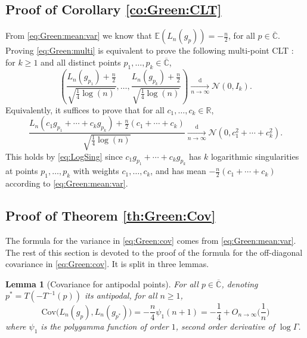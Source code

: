 \documentclass[10pt,reqno]{amsart}
\numberwithin{equation}{section}
\numberwithin{figure}{section}
\theoremstyle{plain}
\newtheorem{lemma}[theorem]{Lemma}
\newcommand{\<}{\langle}
\renewcommand{\>}{\rangle}
\begin{document}
\subsection{Proof of Corollary \ref{co:Green:CLT}}
\label{se:proof:co:Green:CLT}

From \eqref{eq:Green:mean:var} we know that $\mathbb{E}(L_n(g_p))=-\frac{n}{2}$, for all $p\in\overline{\mathbb{C}}$.
Proving \eqref{eq:Green:multi} is equivalent to prove the following multi-point CLT : for $k\geq1$ and all distinct points $p_1,\ldots,p_k\in\overline{\mathbb{C}}$, 
\begin{equation}
    \left(\frac{L_n(g_{p_1})+\frac{n}{2}}{\sqrt{\frac{1}{4}\log(n)}},\ldots,\frac{L_n(g_{p_k})+\frac{n}{2}}{\sqrt{\frac{1}{4}\log(n)}}\right)
    \xrightarrow[n\to\infty]{\mathrm{d}}
    \mathcal{N}(0,I_k).
\end{equation}
Equivalently, it suffices to prove that for all $c_1,\ldots,c_k\in\mathbb{R}$,
\begin{equation}
    \frac{L_n(c_1g_{p_1}+\cdots+c_kg_{p_k})+\frac{n}{2}(c_1+\cdots+c_k)}{\sqrt{\frac{1}{4}\log(n)}}
    \xrightarrow[n\to\infty]{\mathrm{d}}
    \mathcal{N}(0,c_1^2+\cdots+c_k^2).
\end{equation}
This holds by \eqref{eq:LogSing} since $c_1g_{p_1}+\cdots+c_kg_{p_k}$ has $k$ logarithmic singularities at points $p_1,\ldots,p_k$ with weights $c_1,\ldots,c_k$, and has mean $-\frac{n}{2}(c_1+\cdots+c_k)$ according to \eqref{eq:Green:mean:var}. 

\subsection{Proof of Theorem \ref{th:Green:Cov}}
\label{se:proof:th:Green:Cov}

The formula for the variance in \eqref{eq:Green:cov} comes from \eqref{eq:Green:mean:var}. The rest of this section is devoted to the proof of the formula for the off-diagonal covariance in \eqref{eq:Green:cov}. It is split in three lemmas.

\begin{lemma}[Covariance for antipodal points]\label{le:cov-antipodal}
  For all $p\in\overline{\mathbb{C}}$, denoting $p^*=T(-T^{-1}(p))$ its
  antipodal, for all $n\geq 1$, 
  \begin{equation}\label{eq:cov-limit-antip}
    \mathrm{Cov}\big(L_n(g_p),L_n(g_{p^*})\big)
    =-\frac{n}{4}\psi_1(n+1)=-\frac14+O_{n\to\infty}\Big(\frac{1}{n}\Big)
  \end{equation}
  where $\psi_1$ is the polygamma function of order $1$, second order derivative of $\log\Gamma$.
\end{lemma}
\end{document}

